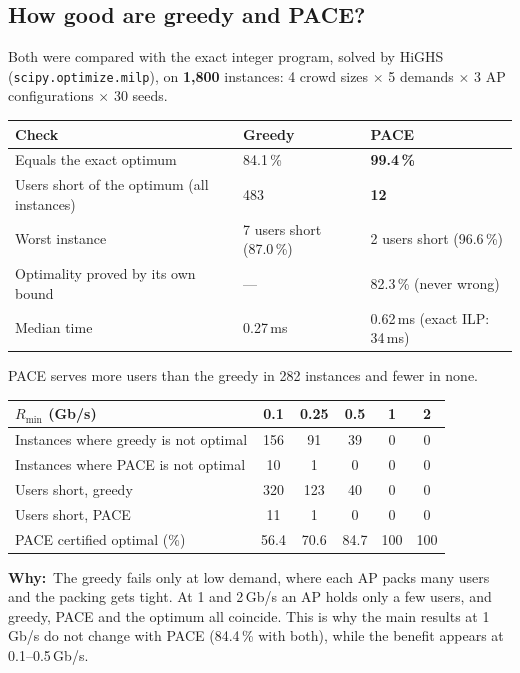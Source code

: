 \documentclass[11pt,a4paper]{article}
\newcommand{\Rmin}{R_{\min}}
\newcommand{\why}[1]{\par\smallskip\noindent\begin{minipage}{\linewidth}\small
  \textcolor{whyc}{\textbf{Why:}}~#1\end{minipage}\par\medskip}
\begin{document}
\subsection{How good are greedy and PACE?}
Both were compared with the exact integer program, solved by HiGHS (\texttt{scipy.optimize.milp}),
on \textbf{1{,}800} instances: 4 crowd sizes $\times$ 5 demands $\times$ 3 AP configurations
$\times$ 30 seeds.
\begin{center}
\begin{tabular}{@{}lll@{}}
\toprule
Check & Greedy & PACE\\
\midrule
Equals the exact optimum & 84.1\,\% & \textbf{99.4\,\%}\\
Users short of the optimum (all instances) & 483 & \textbf{12}\\
Worst instance & 7 users short (87.0\,\%) & 2 users short (96.6\,\%)\\
Optimality proved by its own bound & --- & 82.3\,\% (never wrong)\\
Median time & 0.27\,ms & 0.62\,ms (exact ILP: 34\,ms)\\
\bottomrule
\end{tabular}
\end{center}
PACE serves more users than the greedy in 282 instances and fewer in none.
\begin{center}
\begin{tabular}{@{}lccccc@{}}
\toprule
$\Rmin$ (Gb/s) & 0.1 & 0.25 & 0.5 & 1 & 2\\
\midrule
Instances where greedy is not optimal & 156 & 91 & 39 & 0 & 0\\
Instances where PACE is not optimal & 10 & 1 & 0 & 0 & 0\\
Users short, greedy & 320 & 123 & 40 & 0 & 0\\
Users short, PACE & 11 & 1 & 0 & 0 & 0\\
PACE certified optimal (\%) & 56.4 & 70.6 & 84.7 & 100 & 100\\
\bottomrule
\end{tabular}
\end{center}
\why{The greedy fails only at low demand, where each AP packs many users and the packing gets tight. At 1 and 2\,Gb/s an AP holds only a few users, and greedy, PACE and the optimum all coincide. This is why the main results at 1\,Gb/s do not change with PACE (84.4\,\% with both), while the benefit appears at 0.1--0.5\,Gb/s.}
\end{document}

